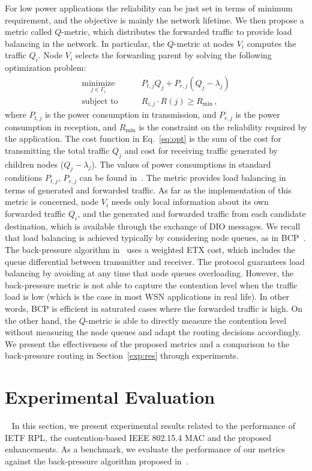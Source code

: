 \documentclass[review, 1p, 11pt]{elsarticle}
\numberwithin{equation}{section}
\begin{document}
For low power applications the reliability can be just set in terms of minimum requirement, and the objective is mainly the network lifetime.
We then propose a metric called $Q$-metric, which distributes the forwarded traffic to provide load balancing in the network.
In particular, the $Q$-metric at nodes $V_i$ computes the traffic $Q_i$. Node $V_i$ selects the forwarding parent by solving the following optimization problem:
\begin{align}\underset{j \in \Gamma_i}{\text{minimize}} \qquad  & P_{t,j} Q_j  + P_{r,j} (Q_j - \lambda_j)  \label{eq:opt}\\
  \text{subject to} \qquad & R_{i,j} \cdot R(j) \geq R_{\min}\,, \nonumber
\end{align}
where $P_{t,j}$ is the power consumption in transmission, and $P_{r,j}$ is the power consumption in reception,  and $R_{\min}$ is the constraint on the reliability required by the application.
The cost function in Eq.~\eqref{eq:opt} is the sum of the cost for transmitting the total  traffic $Q_j$ and cost for receiving traffic generated by children nodes ($Q_j-\lambda_j$).
The values of power consumptions in standard conditions $P_{t,j}$, $P_{r,j}$ can be found in~\cite{Fourty}.
The metric provides load balancing in terms of generated and forwarded traffic.
As far as the implementation of this metric is concerned, node $V_i$ needs only local information about its own forwarded traffic $Q_i$, and the generated and forwarded traffic from each candidate destination, which is available through the exchange of DIO messages.
We recall that load balancing is achieved typically by considering node queues, as in BCP~\cite{BCP}. The back-pressure algorithm in~\cite{BCP}  uses a weighted ETX cost, which includes the queue differential between transmitter and receiver.
The protocol guarantees load balancing by avoiding at any time that node queues overloading. However, the back-pressure metric is not able to capture the contention level when the traffic load is low (which is the case in most WSN applications in real life). In other words, BCP is efficient in saturated cases where the forwarded traffic is high.  On the other hand, the $Q$-metric is able to directly measure the contention level without measuring the node queues and adapt the routing decisions accordingly.
We present the effectiveness of the proposed metrics and a comparison to the back-pressure routing in Section~\ref{exp:res} through experiments.



\section{Experimental Evaluation} ~\label{exp:res}
In this section, we present experimental results related to the
performance of IETF RPL, the contention-based IEEE
802.15.4 MAC and the proposed enhancements.
As a benchmark, we evaluate the performance of our metrics against the back-pressure algorithm proposed in~\cite{BCP}.
\end{document}
